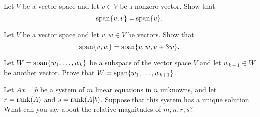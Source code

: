 \documentclass{ximera}
\begin{document}
\begin{exercise} \label{c5.2.8a}
Let $V$ be a vector space and let $v\in V$ be a nonzero vector.  Show that
\[
{\rm span}\{v,v\}={\rm span}\{v\}.
\]
\end{exercise}
\begin{exercise} \label{c5.2.8b}
Let $V$ be a vector space and let $v,w\in V$ be vectors.  Show that
\[
{\rm span}\{v,w\}={\rm span}\{v,w,v+3w\}.
\]
\end{exercise}

\begin{exercise} \label{c5.2.9}
Let $W={\rm span}\{w_1,\ldots,w_k\}$ be a subspace of the vector
space $V$ and let $w_{k+1}\in W$ be another vector.  Prove that
$W={\rm span}\{w_1,\ldots,w_{k+1}\}$.
\end{exercise}

\begin{exercise} \label{c5.2.10}
Let $Ax=b$ be a system of $m$ linear equations in $n$ unknowns,
and let $r={\rm rank}(A)$ and $s={\rm rank}(A|b)$.  Suppose that this system
has a unique solution.  What can you say about the relative
magnitudes of $m,n,r,s$?
\end{exercise}
\end{document}
